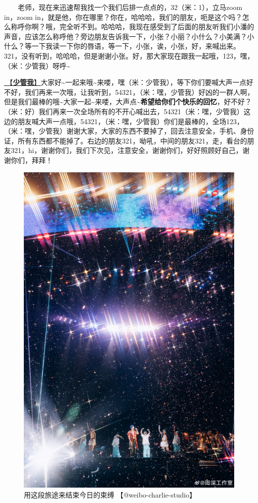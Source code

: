 \documentclass[]{ctexbook}
\begin{document}
  老师，现在来迅速帮我找一个我们后排一点点的，32（米：1），立马zoom in，zoom in，就是他，你在哪里？你在，哈哈哈，我们的朋友，呃是这个吗？怎么称呼你啊？哦，完全听不到。哈哈哈，我现在感受到了后面的朋友听我们小潘的声音，应该怎么称呼他？旁边朋友告诉我一下，小张？小丽？小什么？小美满？小什么？等一下我读一下你的唇语，等一下，小张，诶，小张，好，来喊出来。321，没有听到，哈哈哈，但是谢谢小张。好，那大家现在跟我一起哦，123，嘿，（米：少管我）呀呼\textasciitilde{}

\hyperref[watch-ur-manners]{🎵【\textbf{少管我}】}大家好\textasciitilde 一起来哦\textasciitilde 来喽，嘿（米：少管我），等下你们要喊大声一点好不好，我们再来一次哦，让我听到，54321，（米：嘿，少管我）好凶的一群人啊，但是我们最棒的哦\textasciitilde 大家一起\textasciitilde 来喽，大声点\textasciitilde{}\textbf{希望给你们个快乐的回忆}，好不好？（米：好）我们再来一次全场所有的不开心喊出去，54321（米：嘿，少管我）这边的朋友喊大声一点哦，54321，（米：嘿，少管我）你们是最棒的，全场123，（米：嘿，少管我）谢谢大家，大家的东西不要掉了，回去注意安全，手机、身份证，所有东西都不能掉了。右边的朋友321，呦吼，中间的朋友321，走，看台的朋友321，hi，谢谢你们，我们下次见，注意安全，谢谢你们，好好照顾好自己，谢谢你们，拜拜！

\begin{figure}

{\centering \includegraphics[width=360pt]{img/shanghai20240518/003} 

}

\caption{用这段旅途来结束今日的束缚 【@weibo-charlie-studio】}\label{fig:unnamed-chunk-36}
\end{figure}
\end{document}

